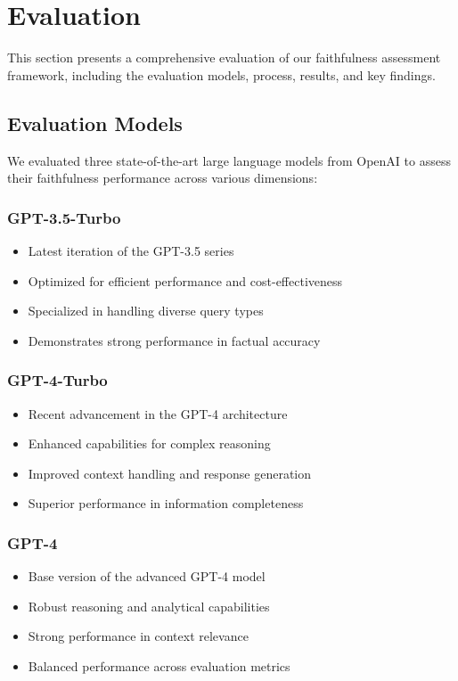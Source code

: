 \section{Evaluation}\label{sec:evaluation}
This section presents a comprehensive evaluation of our faithfulness assessment framework, including the evaluation models, process, results, and key findings.

\subsection{Evaluation Models}
We evaluated three state-of-the-art large language models from OpenAI to assess their faithfulness performance across various dimensions:

\vspace{0.5em}
\subsubsection{GPT-3.5-Turbo}
\begin{itemize}
    \item Latest iteration of the GPT-3.5 series
    \item Optimized for efficient performance and cost-effectiveness
    \item Specialized in handling diverse query types
    \item Demonstrates strong performance in factual accuracy
\end{itemize}

\vspace{0.5em}
\subsubsection{GPT-4-Turbo}
\begin{itemize}
    \item Recent advancement in the GPT-4 architecture
    \item Enhanced capabilities for complex reasoning
    \item Improved context handling and response generation
    \item Superior performance in information completeness
\end{itemize}

\vspace{0.5em}
\subsubsection{GPT-4}
\begin{itemize}
    \item Base version of the advanced GPT-4 model
    \item Robust reasoning and analytical capabilities
    \item Strong performance in context relevance
    \item Balanced performance across evaluation metrics
\end{itemize}

